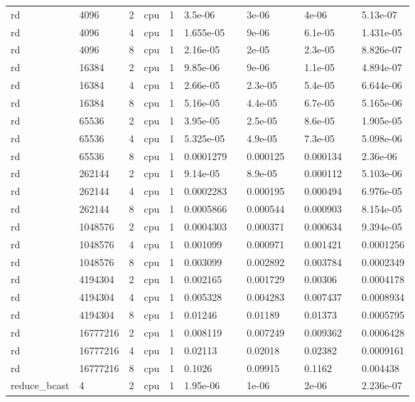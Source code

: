 \begin{tabular}{llllllllllll}
rd & 4096 & 2 & cpu & 1 & 3.5e-06 &  & 3e-06 &  & 4e-06 &  & 5.13e-07 \\
rd & 4096 & 4 & cpu & 1 & 1.655e-05 &  & 9e-06 &  & 6.1e-05 &  & 1.431e-05 \\
rd & 4096 & 8 & cpu & 1 & 2.16e-05 &  & 2e-05 &  & 2.3e-05 &  & 8.826e-07 \\
rd & 16384 & 2 & cpu & 1 & 9.85e-06 &  & 9e-06 &  & 1.1e-05 &  & 4.894e-07 \\
rd & 16384 & 4 & cpu & 1 & 2.66e-05 &  & 2.3e-05 &  & 5.4e-05 &  & 6.644e-06 \\
rd & 16384 & 8 & cpu & 1 & 5.16e-05 &  & 4.4e-05 &  & 6.7e-05 &  & 5.165e-06 \\
rd & 65536 & 2 & cpu & 1 & 3.95e-05 &  & 2.5e-05 &  & 8.6e-05 &  & 1.905e-05 \\
rd & 65536 & 4 & cpu & 1 & 5.325e-05 &  & 4.9e-05 &  & 7.3e-05 &  & 5.098e-06 \\
rd & 65536 & 8 & cpu & 1 & 0.0001279 &  & 0.000125 &  & 0.000134 &  & 2.36e-06 \\
rd & 262144 & 2 & cpu & 1 & 9.14e-05 &  & 8.9e-05 &  & 0.000112 &  & 5.103e-06 \\
rd & 262144 & 4 & cpu & 1 & 0.0002283 &  & 0.000195 &  & 0.000494 &  & 6.976e-05 \\
rd & 262144 & 8 & cpu & 1 & 0.0005866 &  & 0.000544 &  & 0.000903 &  & 8.154e-05 \\
rd & 1048576 & 2 & cpu & 1 & 0.0004303 &  & 0.000371 &  & 0.000634 &  & 9.394e-05 \\
rd & 1048576 & 4 & cpu & 1 & 0.001099 &  & 0.000971 &  & 0.001421 &  & 0.0001256 \\
rd & 1048576 & 8 & cpu & 1 & 0.003099 &  & 0.002892 &  & 0.003784 &  & 0.0002349 \\
rd & 4194304 & 2 & cpu & 1 & 0.002165 &  & 0.001729 &  & 0.00306 &  & 0.0004178 \\
rd & 4194304 & 4 & cpu & 1 & 0.005328 &  & 0.004283 &  & 0.007437 &  & 0.0008934 \\
rd & 4194304 & 8 & cpu & 1 & 0.01246 &  & 0.01189 &  & 0.01373 &  & 0.0005795 \\
rd & 16777216 & 2 & cpu & 1 & 0.008119 &  & 0.007249 &  & 0.009362 &  & 0.0006428 \\
rd & 16777216 & 4 & cpu & 1 & 0.02113 &  & 0.02018 &  & 0.02382 &  & 0.0009161 \\
rd & 16777216 & 8 & cpu & 1 & 0.1026 &  & 0.09915 &  & 0.1162 &  & 0.004438 \\
reduce\_bcast & 4 & 2 & cpu & 1 & 1.95e-06 &  & 1e-06 &  & 2e-06 &  & 2.236e-07 \\

\end{tabular}
